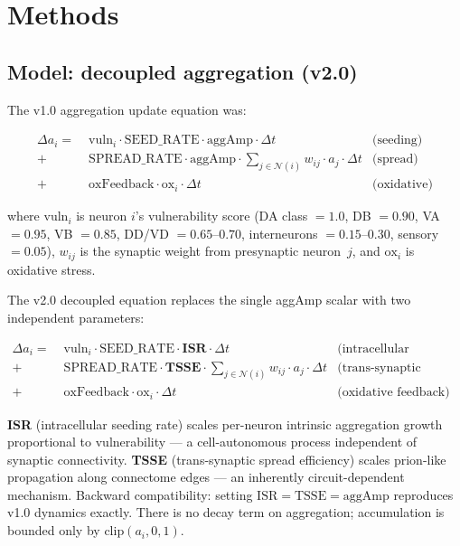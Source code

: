 \documentclass[12pt,a4paper]{article}
\begin{document}
\section{Methods}

\subsection{Model: decoupled aggregation (v2.0)}

The v1.0 aggregation update equation was:

\begin{align}
\Delta a_i = \;& \mathrm{vuln}_i \cdot \mathrm{SEED\_RATE} \cdot \mathrm{aggAmp}
               \cdot \Delta t
               & \text{(seeding)} \nonumber \\
           +\;& \mathrm{SPREAD\_RATE} \cdot \mathrm{aggAmp}
               \cdot \sum_{j \in \mathcal{N}(i)} w_{ij} \cdot a_j \cdot \Delta t
               & \text{(spread)} \nonumber \\
           +\;& \mathrm{oxFeedback} \cdot \mathrm{ox}_i \cdot \Delta t
               & \text{(oxidative)} \nonumber
\end{align}

where $\mathrm{vuln}_i$ is neuron $i$'s vulnerability score (DA class $= 1.0$, DB $= 0.90$,
VA $= 0.95$, VB $= 0.85$, DD/VD $= 0.65$--$0.70$, interneurons $= 0.15$--$0.30$, sensory
$= 0.05$), $w_{ij}$ is the synaptic weight from presynaptic neuron~$j$, and $\mathrm{ox}_i$
is oxidative stress.

The v2.0 decoupled equation replaces the single aggAmp scalar with two independent parameters:

\begin{align}
\Delta a_i = \;& \mathrm{vuln}_i \cdot \mathrm{SEED\_RATE} \cdot \mathbf{ISR}
               \cdot \Delta t
               & \text{(intracellular seeding)} \nonumber \\
           +\;& \mathrm{SPREAD\_RATE} \cdot \mathbf{TSSE}
               \cdot \sum_{j \in \mathcal{N}(i)} w_{ij} \cdot a_j \cdot \Delta t
               & \text{(trans-synaptic spread)} \nonumber \\
           +\;& \mathrm{oxFeedback} \cdot \mathrm{ox}_i \cdot \Delta t
               & \text{(oxidative feedback)} \label{eq:v2_agg}
\end{align}

\textbf{ISR} (intracellular seeding rate) scales per-neuron intrinsic aggregation growth
proportional to vulnerability --- a cell-autonomous process independent of synaptic
connectivity. \textbf{TSSE} (trans-synaptic spread efficiency) scales prion-like propagation
along connectome edges --- an inherently circuit-dependent mechanism. Backward compatibility:
setting $\mathrm{ISR} = \mathrm{TSSE} = \mathrm{aggAmp}$ reproduces v1.0 dynamics exactly.
There is no decay term on aggregation; accumulation is bounded only by $\mathrm{clip}(a_i,
0, 1)$.
\end{document}
